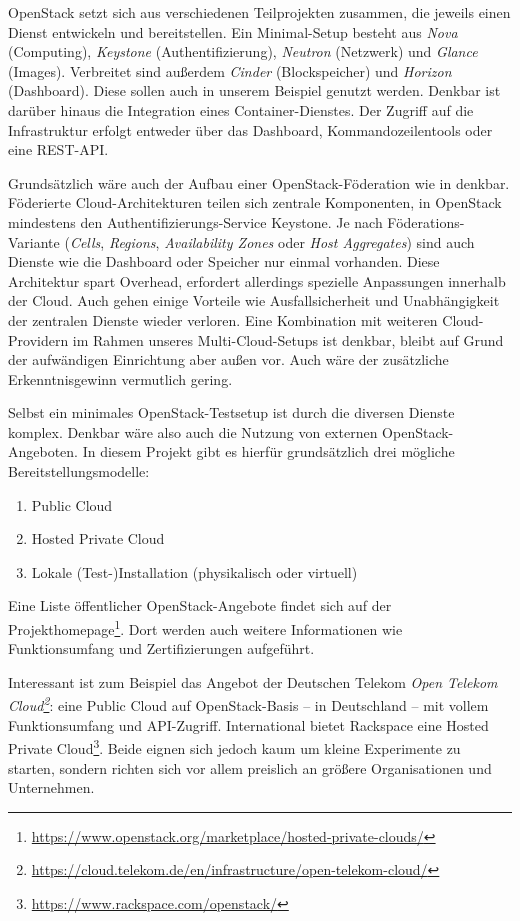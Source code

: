 OpenStack setzt sich aus verschiedenen Teilprojekten zusammen, die jeweils einen Dienst entwickeln und bereitstellen. Ein Minimal-Setup besteht aus \emph{Nova} (Computing), \emph{Key\-stone} (Authentifizierung), \emph{Neutron} (Netzwerk) und \emph{Glance} (Images). Verbreitet sind außerdem \emph{Cinder} (Blockspeicher) und \emph{Horizon} (Dash\-board). Diese sollen auch in unserem Beispiel genutzt werden. Denkbar ist darüber hinaus die Integration eines Container-Dienstes. Der Zugriff auf die Infrastruktur erfolgt entweder über das Dashboard, Kommandozeilentools oder eine REST-API.

Grundsätzlich wäre auch der Aufbau einer OpenStack-Föderation wie in \cite{ssiclops:2015:d6.1-project-presentation} denkbar. Föderierte Cloud-Architekturen teilen sich zentrale Komponenten, in OpenStack mindestens den Authentifizierungs-Service Keystone. Je nach Föderations-Variante (\emph{Cells}, \emph{Regions}, \emph{Availability Zones} oder \emph{Host Aggregates}) sind auch Dienste wie die Dashboard oder Speicher nur einmal vorhanden. Diese Architektur spart Overhead, erfordert allerdings spezielle Anpassungen innerhalb der Cloud. Auch gehen einige Vorteile wie Ausfallsicherheit und Unabhängigkeit der zentralen Dienste wieder verloren. Eine Kombination mit weiteren Cloud-Providern im Rahmen unseres Multi-Cloud-Setups ist denkbar, bleibt auf Grund der aufwändigen Einrichtung aber außen vor. Auch wäre der zusätzliche Erkenntnisgewinn vermutlich gering.

Selbst ein minimales OpenStack-Testsetup ist durch die diversen Dienste komplex. Denkbar wäre also auch die Nutzung von externen OpenStack-Angeboten. In diesem Projekt gibt es hierfür grundsätzlich drei mögliche Bereitstellungsmodelle:

\begin{enumerate}
	\item Public Cloud
	\item Hosted Private Cloud
	\item Lokale (Test-)Installation (physikalisch oder virtuell)
\end{enumerate}

\noindent Eine Liste öffentlicher OpenStack-Angebote findet sich auf der Projekthomepage\footnote{\url{https://www.openstack.org/marketplace/hosted-private-clouds/}}. Dort werden auch weitere Informationen wie Funktionsumfang und Zertifizierungen aufgeführt. 

Interessant ist zum Beispiel das Angebot der Deutschen Telekom \emph{Open Telekom Cloud\footnote{\url{https://cloud.telekom.de/en/infrastructure/open-telekom-cloud/}}}: eine Public Cloud auf OpenStack-Basis -- in Deutschland -- mit vollem Funktionsumfang und API-Zugriff. International bietet Rackspace eine Hosted Private Cloud\footnote{\url{https://www.rackspace.com/openstack/}}. Beide eignen sich jedoch kaum um kleine Experimente zu starten, sondern richten sich vor allem preislich an größere Organisationen und Unternehmen.

